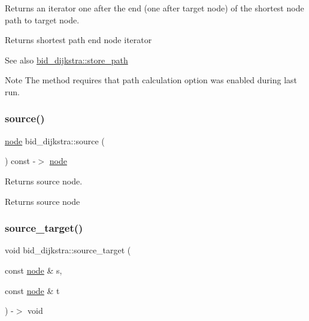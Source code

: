 Returns an iterator one after the end (one after target node) of the shortest node path to target node. 

\begin{DoxyReturn}{Returns}
shortest path end node iterator
\end{DoxyReturn}
\begin{DoxySeeAlso}{See also}
\mbox{\hyperlink{classbid__dijkstra_aa095beede9c50b1f1e482049a2a4b619}{bid\+\_\+dijkstra\+::store\+\_\+path}}
\end{DoxySeeAlso}
\begin{DoxyNote}{Note}
The method requires that path calculation option was enabled during last run. 
\end{DoxyNote}
\mbox{\label{classbid__dijkstra_a916d7f45a21259fd1f4e2010924cf276}} 
\subsubsection{\texorpdfstring{source()}{source()}}
{\footnotesize\ttfamily \mbox{\hyperlink{classnode}{node}} bid\+\_\+dijkstra\+::source (\begin{DoxyParamCaption}{ }\end{DoxyParamCaption}) const -\/$>$ \mbox{\hyperlink{classnode}{node}}}



Returns source node. 

\begin{DoxyReturn}{Returns}
source node 
\end{DoxyReturn}
\mbox{\label{classbid__dijkstra_a8f9cf576f64dbb4540655d4625930422}} 
\subsubsection{\texorpdfstring{source\+\_\+target()}{source\_target()}}
{\footnotesize\ttfamily void bid\+\_\+dijkstra\+::source\+\_\+target (\begin{DoxyParamCaption}\item[{const \mbox{\hyperlink{classnode}{node}} \&}]{s,  }\item[{const \mbox{\hyperlink{classnode}{node}} \&}]{t }\end{DoxyParamCaption}) -\/$>$ void}




